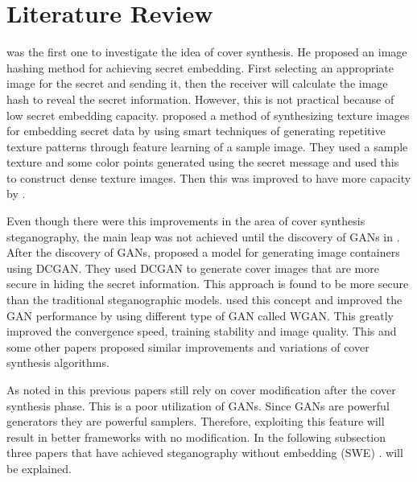 \documentclass[../main/main.tex]{subfiles}
\begin{document}
	
	\section{Literature Review} \label{Literature}
	  was the first one to investigate the idea of cover synthesis.  He proposed an image hashing method for achieving secret embedding. First selecting an appropriate image for the secret and sending it, then the receiver will calculate the image hash to reveal the secret information. However, this is not practical because of low secret embedding capacity.  proposed a method of synthesizing texture images for embedding secret data by using smart techniques of generating repetitive texture patterns through feature learning of a sample image. They used a sample texture and some color points generated using the secret message and used this to construct dense texture images. Then this was improved to have more capacity by . 
	 
	 Even though there were this improvements in the area of cover synthesis steganography, the main leap was not achieved until the discovery of \gls{GAN}s in . After the discovery of \gls{GAN}s,   proposed a model for generating image containers using \gls{DCGAN}. They used \gls{DCGAN} to generate cover images that are more secure in hiding the secret information. This approach is found to be more secure than the traditional steganographic models.  used this concept and improved the \gls{GAN} performance by using different type of \gls{GAN} called \gls{WGAN}. This greatly improved the convergence speed, training stability and image quality. This and some other papers proposed similar improvements and variations of cover synthesis algorithms.
	 
	 As noted in  this previous papers still rely on cover modification after the cover synthesis phase. This is a poor utilization of \gls{GAN}s. Since \gls{GAN}s are powerful generators they are powerful samplers. Therefore, exploiting this feature will result in better frameworks with no modification. In the following subsection three papers that have achieved steganography without embedding (\gls{SWE}) . will be explained.
	 
\end{document}
